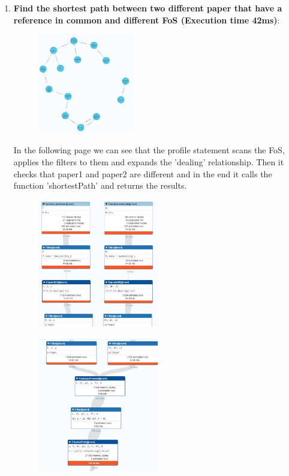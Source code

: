 \documentclass{Configuration_Files/PoliMi3i_thesis}
\begin{document}
\begin{enumerate}
\begin{figure}[H]
    \end{figure}
    \newpage
    \item \textbf{Find the shortest path between two different paper that have a reference in common and different FoS (Execution time 42ms)}:
    
    \begin{figure}[H]
    \centering
    \includegraphics[width=0.4\textwidth]{Images/queries_neo4j/query_10.jpg}
    \end{figure}
  In the following page we can see that the profile statement scans the FoS, applies the filters to them and expands the 'dealing' relationship. Then it checks that paper1 and paper2 are different and in the end it calls the function 'shortestPath' and returns the results.
    \begin{figure}[H]
    \centering
    \includegraphics[width=0.5\textwidth]{Images/queries_neo4j/query_10_p1.jpg}
    \end{figure}
    \begin{figure}[H]
    \centering
    \includegraphics[width=0.5\textwidth]{Images/queries_neo4j/query_10_p2.jpg}

\end{figure}
\end{enumerate}
\end{document}
